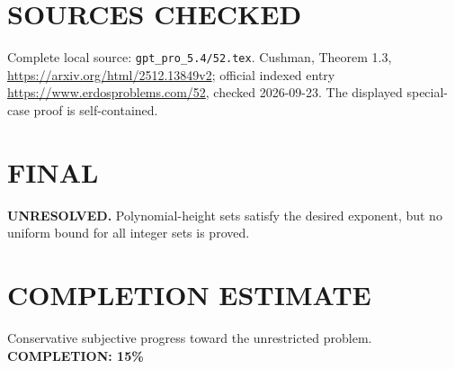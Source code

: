 \section{SOURCES CHECKED}
Complete local source: \texttt{gpt\_pro\_5.4/52.tex}. Cushman, Theorem 1.3, \url{https://arxiv.org/html/2512.13849v2}; official indexed entry \url{https://www.erdosproblems.com/52}, checked 2026-09-23. The displayed special-case proof is self-contained.
\section{FINAL}
\textbf{UNRESOLVED.} Polynomial-height sets satisfy the desired exponent, but no uniform bound for all integer sets is proved.
\section{COMPLETION ESTIMATE}
Conservative subjective progress toward the unrestricted problem.
\textbf{COMPLETION: 15\%}
